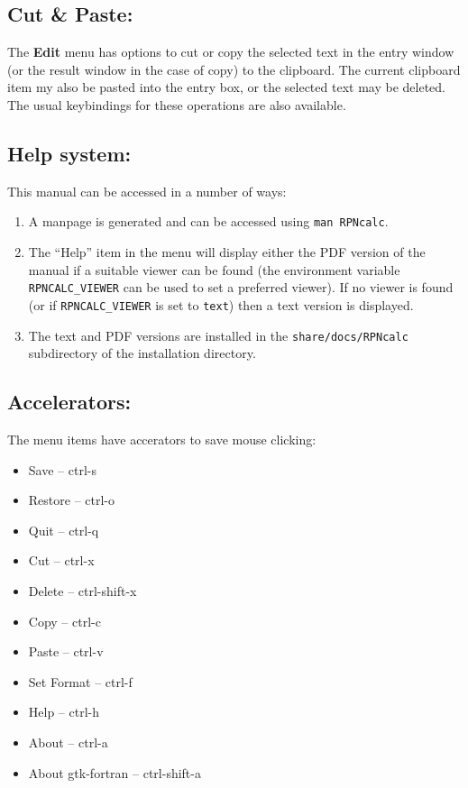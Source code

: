 \documentclass{article}
\begin{document}
\subsection{Cut \& Paste:}

The \textbf{Edit} menu has options to cut or copy the selected text in
the entry window (or the result window in the case of copy) to the
clipboard. The current clipboard item my also be pasted into the entry
box, or the selected text may be deleted. The usual keybindings for
these operations are also available.

\subsection{Help system:}

This manual can be accessed in a number of ways:
\begin{enumerate}
\item A manpage is generated and can be accessed using 
\texttt{man RPNcalc}.
\item The ``Help'' item in the menu will display either the PDF version
  of the manual if a suitable viewer can be found (the environment
  variable \texttt{RPNCALC\_VIEWER} can be used to set a preferred
  viewer). If no viewer is found (or if  \texttt{RPNCALC\_VIEWER} is
  set to \texttt{text}) then a text version is displayed.
\item The text and PDF versions are installed in the
  \texttt{share/docs/RPNcalc} subdirectory of the installation directory.
\end{enumerate}

\subsection{Accelerators:}

The menu items have accerators to save mouse clicking:

\begin{itemize}
\item Save -- ctrl-s
\item Restore -- ctrl-o
\item Quit -- ctrl-q
\item Cut -- ctrl-x
\item Delete -- ctrl-shift-x
\item Copy -- ctrl-c
\item Paste -- ctrl-v
\item Set Format -- ctrl-f
\item Help -- ctrl-h
\item About -- ctrl-a
\item About gtk-fortran -- ctrl-shift-a
\end{itemize}
\end{document}
